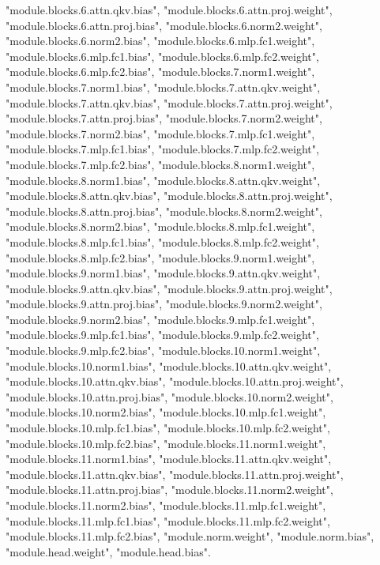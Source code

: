 "module.blocks.6.attn.qkv.bias", "module.blocks.6.attn.proj.weight", "module.blocks.6.attn.proj.bias", "module.blocks.6.norm2.weight", "module.blocks.6.norm2.bias", "module.blocks.6.mlp.fc1.weight", "module.blocks.6.mlp.fc1.bias", "module.blocks.6.mlp.fc2.weight", "module.blocks.6.mlp.fc2.bias", "module.blocks.7.norm1.weight", "module.blocks.7.norm1.bias", "module.blocks.7.attn.qkv.weight", "module.blocks.7.attn.qkv.bias", "module.blocks.7.attn.proj.weight", "module.blocks.7.attn.proj.bias", "module.blocks.7.norm2.weight", "module.blocks.7.norm2.bias", "module.blocks.7.mlp.fc1.weight", "module.blocks.7.mlp.fc1.bias", "module.blocks.7.mlp.fc2.weight", "module.blocks.7.mlp.fc2.bias", "module.blocks.8.norm1.weight", "module.blocks.8.norm1.bias", "module.blocks.8.attn.qkv.weight", "module.blocks.8.attn.qkv.bias", "module.blocks.8.attn.proj.weight", "module.blocks.8.attn.proj.bias", "module.blocks.8.norm2.weight", "module.blocks.8.norm2.bias", "module.blocks.8.mlp.fc1.weight", "module.blocks.8.mlp.fc1.bias", "module.blocks.8.mlp.fc2.weight", "module.blocks.8.mlp.fc2.bias", "module.blocks.9.norm1.weight", "module.blocks.9.norm1.bias", "module.blocks.9.attn.qkv.weight", "module.blocks.9.attn.qkv.bias", "module.blocks.9.attn.proj.weight", "module.blocks.9.attn.proj.bias", "module.blocks.9.norm2.weight", "module.blocks.9.norm2.bias", "module.blocks.9.mlp.fc1.weight", "module.blocks.9.mlp.fc1.bias", "module.blocks.9.mlp.fc2.weight", "module.blocks.9.mlp.fc2.bias", "module.blocks.10.norm1.weight", "module.blocks.10.norm1.bias", "module.blocks.10.attn.qkv.weight", "module.blocks.10.attn.qkv.bias", "module.blocks.10.attn.proj.weight", "module.blocks.10.attn.proj.bias", "module.blocks.10.norm2.weight", "module.blocks.10.norm2.bias", "module.blocks.10.mlp.fc1.weight", "module.blocks.10.mlp.fc1.bias", "module.blocks.10.mlp.fc2.weight", "module.blocks.10.mlp.fc2.bias", "module.blocks.11.norm1.weight", "module.blocks.11.norm1.bias", "module.blocks.11.attn.qkv.weight", "module.blocks.11.attn.qkv.bias", "module.blocks.11.attn.proj.weight", "module.blocks.11.attn.proj.bias", "module.blocks.11.norm2.weight", "module.blocks.11.norm2.bias", "module.blocks.11.mlp.fc1.weight", "module.blocks.11.mlp.fc1.bias", "module.blocks.11.mlp.fc2.weight", "module.blocks.11.mlp.fc2.bias", "module.norm.weight", "module.norm.bias", "module.head.weight", "module.head.bias". 
